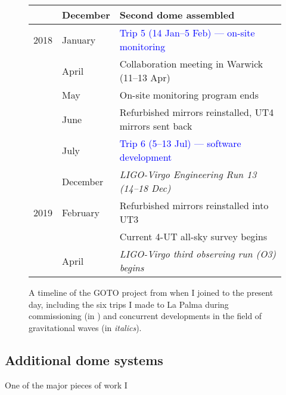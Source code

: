 \begin{colsection}
\begin{colsection}
\begin{figure}[p]
\begin{center}
\begin{tabular}{cl|@{\tls}l}
                 & December  & Second dome assembled \\
            \midrule
            2018 & January   & \textcolor{Blue}{Trip 5 (14 Jan--5 Feb) --- on-site monitoring} \\
                 & April     & Collaboration meeting in Warwick (11--13 Apr)\\
                 & May       & On-site monitoring program ends \\
                 & June      & Refurbished mirrors reinstalled, UT4 mirrors sent back \\
                 & July      & \textcolor{Blue}{Trip 6 (5--13 Jul) --- software development} \\
                 & December  & \textit{LIGO-Virgo Engineering Run 13 (14--18 Dec)} \\
            \midrule
            2019 & February  & Refurbished mirrors reinstalled into UT3 \\
                 &           & Current 4-UT all-sky survey begins \\
                 & April     & \textit{LIGO-Virgo third observing run (O3) begins} \\
        \end{tabular}
    \end{center}
    \caption[Timeline of the GOTO project]{
        A timeline of the GOTO project from when I joined to the present day, including the six trips I made to La Palma during commissioning (in ) and concurrent developments in the field of gravitational waves (in \textit{italics}).
    }\label{tab:timeline}
\end{figure}

\end{colsection}


\subsection{Additional dome systems}
\label{sec:arduino}
\begin{colsection}

One of the major pieces of work I

\end{colsection}


\end{colsection}


